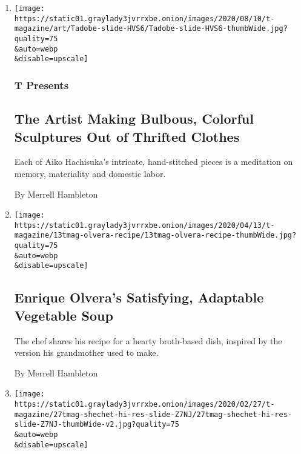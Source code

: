 \begin{enumerate}
\def\labelenumi{\arabic{enumi}.}
\item
  \href{/2020/08/10/t-magazine/aiko-hachisuka-art-sculpture.html}{}

  \texttt{[image: https://static01.graylady3jvrrxbe.onion/images/2020/08/10/t-magazine/art/Tadobe-slide-HVS6/Tadobe-slide-HVS6-thumbWide.jpg?quality=75\\\&auto=webp\\\&disable=upscale]}

  \hypertarget{t-presents}{%
  \subsubsection{T Presents}\label{t-presents}}

  \hypertarget{the-artist-making-bulbous-colorful-sculptures-out-of-thrifted-clothes}{%
  \subsection{The Artist Making Bulbous, Colorful Sculptures Out of
  Thrifted
  Clothes}\label{the-artist-making-bulbous-colorful-sculptures-out-of-thrifted-clothes}}

  Each of Aiko Hachisuka's intricate, hand-stitched pieces is a
  meditation on memory, materiality and domestic labor.

  By Merrell Hambleton
\item
  \href{/2020/04/13/t-magazine/enrique-olvera-vegetable-soup-recipe.html}{}

  \texttt{[image: https://static01.graylady3jvrrxbe.onion/images/2020/04/13/t-magazine/13tmag-olvera-recipe/13tmag-olvera-recipe-thumbWide.jpg?quality=75\\\&auto=webp\\\&disable=upscale]}

  \hypertarget{enrique-olveras-satisfying-adaptable-vegetable-soup}{%
  \subsection{Enrique Olvera's Satisfying, Adaptable Vegetable
  Soup}\label{enrique-olveras-satisfying-adaptable-vegetable-soup}}

  The chef shares his recipe for a hearty broth-based dish, inspired by
  the version his grandmother used to make.

  By Merrell Hambleton
\item
  \href{/2020/02/27/t-magazine/arlene-shechet.html}{}

  \texttt{[image: https://static01.graylady3jvrrxbe.onion/images/2020/02/27/t-magazine/27tmag-shechet-hi-res-slide-Z7NJ/27tmag-shechet-hi-res-slide-Z7NJ-thumbWide-v2.jpg?quality=75\\\&auto=webp\\\&disable=upscale]}


\end{enumerate}
